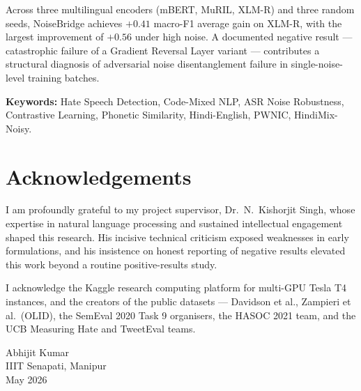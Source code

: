 \documentclass[12pt,a4paper]{report}
\begin{document}
Across three multilingual encoders (mBERT, MuRIL, XLM-R) and three random seeds, NoiseBridge achieves $+0.41$ macro-F1 average gain on XLM-R, with the largest improvement of $+0.56$ under high noise. A documented negative result --- catastrophic failure of a Gradient Reversal Layer variant --- contributes a structural diagnosis of adversarial noise disentanglement failure in single-noise-level training batches.

\vspace{12pt}
\noindent\textbf{Keywords:} Hate Speech Detection, Code-Mixed NLP, ASR Noise Robustness, Contrastive Learning, Phonetic Similarity, Hindi-English, PWNIC, HindiMix-Noisy.
\clearpage

\chapter*{Acknowledgements}
I am profoundly grateful to my project supervisor, Dr.\ N.\ Kishorjit Singh, whose expertise in natural language processing and sustained intellectual engagement shaped this research. His incisive technical criticism exposed weaknesses in early formulations, and his insistence on honest reporting of negative results elevated this work beyond a routine positive-results study.

I acknowledge the Kaggle research computing platform for multi-GPU Tesla T4 instances, and the creators of the public datasets --- Davidson et al., Zampieri et al.\ (OLID), the SemEval 2020 Task 9 organisers, the HASOC 2021 team, and the UCB Measuring Hate and TweetEval teams.

\vspace{20pt}
\begin{flushright}
Abhijit Kumar\\
IIIT Senapati, Manipur\\
May 2026
\end{flushright}
\clearpage

\tableofcontents\clearpage
\listoffigures\clearpage
\listoftables\clearpage

\end{document}
